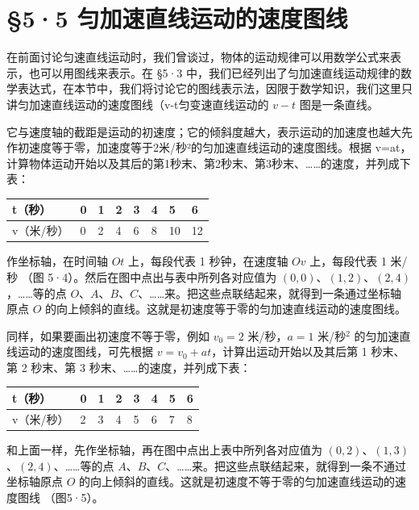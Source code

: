 \section{§5·5
匀加速直线运动的速度图线}\label{ux5300ux52a0ux901fux76f4ux7ebfux8fd0ux52a8ux7684ux901fux5ea6ux56feux7ebf}

在前面讨论匀速直线运动时，我们曾谈过，物体的运动规律可以用数学公式来表示，也可以用图线来表示。在
§5·3
中，我们已经列出了匀加速直线运动规律的数学表达式，在本节中，我们将讨论它的图线表示法，因限于数学知识，我们这里只讲匀加速直线运动的速度图线（v-t匀变速直线运动的
\(v - t\) 图是一条直线。

它与速度轴的截距是运动的初速度；它的倾斜度越大，表示运动的加速度也越大先作初速度等于零，加速度等于2米/秒²的匀加速直线运动的速度图线。根据
v=at，计算物体运动开始以及其后的第1秒末、第2秒末、第3秒末、\ldots\ldots 的速度，并列成下表：

{\def\LTcaptype{none} %
\begin{longtable}[]{@{}llllllll@{}}
\toprule\noalign{}
t（秒） & 0 & 1 & 2 & 3 & 4 & 5 & 6 \\
\midrule\noalign{}
\endhead
\bottomrule\noalign{}
\endlastfoot
v（米/秒） & 0 & 2 & 4 & 6 & 8 & 10 & 12 \\
\end{longtable}
}

作坐标轴，在时间轴 \(Ot\) 上，每段代表 1 秒钟，在速度轴 \(Ov\)
上，每段代表 1 米/秒 （图 5·4）。然后在图中点出与表中所列各对应值为
\((0, 0)\)、\((1, 2)\)、\((2, 4)\)，\ldots\ldots 等的点
\(O\)、\(A\)、\(B\)、\(C\)、\ldots\ldots 来。把这些点联结起来，就得到一条通过坐标轴原点
\(O\) 的向上倾斜的直线。这就是初速度等于零的匀加速直线运动的速度图线。

同样，如果要画出初速度不等于零，例如 \(v_{0} = 2\) 米/秒，\(a = 1\)
米/秒\(^{2}\) 的匀加速直线运动的速度图线，可先根据
\(v = v_{0} + at\)，计算出运动开始以及其后第 1 秒末、第 2 秒末、第 3
秒末、\ldots\ldots 的速度，并列成下表：

{\def\LTcaptype{none} %
\begin{longtable}[]{@{}llllllll@{}}
\toprule\noalign{}
t（秒） & 0 & 1 & 2 & 3 & 4 & 5 & 6 \\
\midrule\noalign{}
\endhead
\bottomrule\noalign{}
\endlastfoot
v（米/秒） & 2 & 3 & 4 & 5 & 6 & 7 & 8 \\
\end{longtable}
}

和上面一样，先作坐标轴，再在图中点出上表中所列各对应值为
\((0, 2)\)、\((1, 3)\)、\((2, 4)\)、\ldots\ldots 等的点
\(A\)、\(B\)、\(C\)、\ldots\ldots 来。把这些点联结起来，就得到一条不通过坐标轴原点
\(O\) 的向上倾斜的直线。这就是初速度不等于零的匀加速直线运动的速度图线
（图5·5）。

